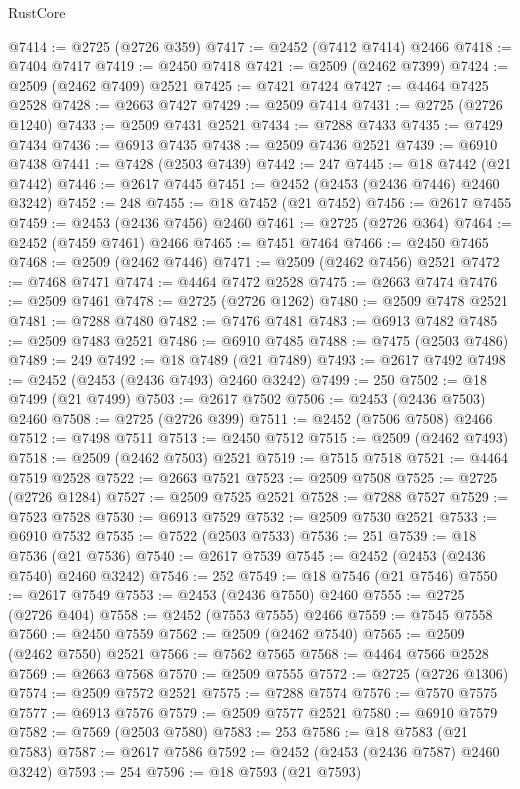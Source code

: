 \begin{lexlean}{RustCore}
\begin{coremodule}
@7414 := @2725 (@2726 @359)
@7417 := @2452 (@7412 @7414) @2466
@7418 := @7404 @7417
@7419 := @2450 @7418
@7421 := @2509 (@2462 @7399)
@7424 := @2509 (@2462 @7409) @2521
@7425 := @7421 @7424
@7427 := @4464 @7425 @2528
@7428 := @2663 @7427
@7429 := @2509 @7414
@7431 := @2725 (@2726 @1240)
@7433 := @2509 @7431 @2521
@7434 := @7288 @7433
@7435 := @7429 @7434
@7436 := @6913 @7435
@7438 := @2509 @7436 @2521
@7439 := @6910 @7438
@7441 := @7428 (@2503 @7439)
@7442 := 247
@7445 := @18 @7442 (@21 @7442)
@7446 := @2617 @7445
@7451 := @2452 (@2453 (@2436 @7446) @2460 @3242)
@7452 := 248
@7455 := @18 @7452 (@21 @7452)
@7456 := @2617 @7455
@7459 := @2453 (@2436 @7456) @2460
@7461 := @2725 (@2726 @364)
@7464 := @2452 (@7459 @7461) @2466
@7465 := @7451 @7464
@7466 := @2450 @7465
@7468 := @2509 (@2462 @7446)
@7471 := @2509 (@2462 @7456) @2521
@7472 := @7468 @7471
@7474 := @4464 @7472 @2528
@7475 := @2663 @7474
@7476 := @2509 @7461
@7478 := @2725 (@2726 @1262)
@7480 := @2509 @7478 @2521
@7481 := @7288 @7480
@7482 := @7476 @7481
@7483 := @6913 @7482
@7485 := @2509 @7483 @2521
@7486 := @6910 @7485
@7488 := @7475 (@2503 @7486)
@7489 := 249
@7492 := @18 @7489 (@21 @7489)
@7493 := @2617 @7492
@7498 := @2452 (@2453 (@2436 @7493) @2460 @3242)
@7499 := 250
@7502 := @18 @7499 (@21 @7499)
@7503 := @2617 @7502
@7506 := @2453 (@2436 @7503) @2460
@7508 := @2725 (@2726 @399)
@7511 := @2452 (@7506 @7508) @2466
@7512 := @7498 @7511
@7513 := @2450 @7512
@7515 := @2509 (@2462 @7493)
@7518 := @2509 (@2462 @7503) @2521
@7519 := @7515 @7518
@7521 := @4464 @7519 @2528
@7522 := @2663 @7521
@7523 := @2509 @7508
@7525 := @2725 (@2726 @1284)
@7527 := @2509 @7525 @2521
@7528 := @7288 @7527
@7529 := @7523 @7528
@7530 := @6913 @7529
@7532 := @2509 @7530 @2521
@7533 := @6910 @7532
@7535 := @7522 (@2503 @7533)
@7536 := 251
@7539 := @18 @7536 (@21 @7536)
@7540 := @2617 @7539
@7545 := @2452 (@2453 (@2436 @7540) @2460 @3242)
@7546 := 252
@7549 := @18 @7546 (@21 @7546)
@7550 := @2617 @7549
@7553 := @2453 (@2436 @7550) @2460
@7555 := @2725 (@2726 @404)
@7558 := @2452 (@7553 @7555) @2466
@7559 := @7545 @7558
@7560 := @2450 @7559
@7562 := @2509 (@2462 @7540)
@7565 := @2509 (@2462 @7550) @2521
@7566 := @7562 @7565
@7568 := @4464 @7566 @2528
@7569 := @2663 @7568
@7570 := @2509 @7555
@7572 := @2725 (@2726 @1306)
@7574 := @2509 @7572 @2521
@7575 := @7288 @7574
@7576 := @7570 @7575
@7577 := @6913 @7576
@7579 := @2509 @7577 @2521
@7580 := @6910 @7579
@7582 := @7569 (@2503 @7580)
@7583 := 253
@7586 := @18 @7583 (@21 @7583)
@7587 := @2617 @7586
@7592 := @2452 (@2453 (@2436 @7587) @2460 @3242)
@7593 := 254
@7596 := @18 @7593 (@21 @7593)

\end{coremodule}
\end{lexlean}
